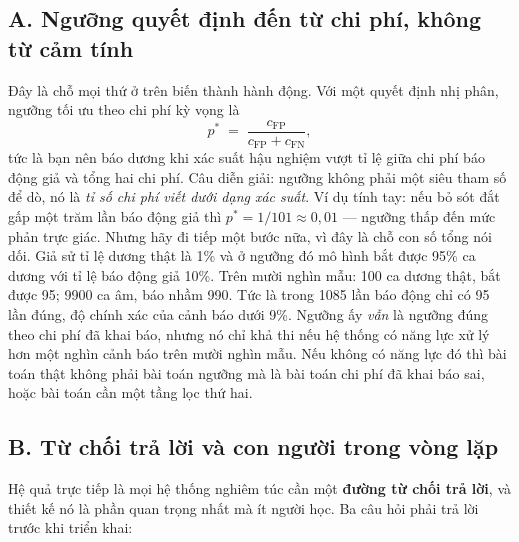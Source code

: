 \documentclass[../../deep_learning.tex]{subfiles}
\begin{document}
\subsection{A. Ngưỡng quyết định đến từ chi phí, không từ cảm tính}
Đây là chỗ mọi thứ ở trên biến thành hành động. Với một quyết định nhị phân, ngưỡng tối ưu theo chi phí kỳ vọng là
\[
p^{*} \;=\; \frac{c_{\mathrm{FP}}}{c_{\mathrm{FP}} + c_{\mathrm{FN}}},
\]
tức là bạn nên báo dương khi xác suất hậu nghiệm vượt tỉ lệ giữa chi phí báo động giả và tổng hai chi phí. Câu diễn giải: ngưỡng không phải một siêu tham số để dò, nó là \emph{tỉ số chi phí viết dưới dạng xác suất}.
 Ví dụ tính tay: nếu bỏ sót đắt gấp một trăm lần báo động giả thì \(p^{*} = 1/101 \approx 0{,}01\) --- ngưỡng thấp đến mức phản trực giác. Nhưng hãy đi tiếp một bước nữa, vì đây là chỗ con số tổng nói dối. Giả sử tỉ lệ dương thật là 1\% và ở ngưỡng đó mô hình bắt được 95\% ca dương với tỉ lệ báo động giả 10\%. Trên mười nghìn mẫu: 100 ca dương thật, bắt được 95; 9900 ca âm, báo nhầm 990. Tức là trong 1085 lần báo động chỉ có 95 lần đúng, độ chính xác của cảnh báo dưới 9\%. Ngưỡng ấy \emph{vẫn} là ngưỡng đúng theo chi phí đã khai báo, nhưng nó chỉ khả thi nếu hệ thống có năng lực xử lý hơn một nghìn cảnh báo trên mười nghìn mẫu. Nếu không có năng lực đó thì bài toán thật không phải bài toán ngưỡng mà là bài toán chi phí đã khai báo sai, hoặc bài toán cần một tầng lọc thứ hai.

\subsection{B. Từ chối trả lời và con người trong vòng lặp}
Hệ quả trực tiếp là mọi hệ thống nghiêm túc cần một \textbf{đường từ chối trả lời}, và thiết kế nó là phần quan trọng nhất mà ít người học. Ba câu hỏi phải trả lời trước khi triển khai:
\end{document}
